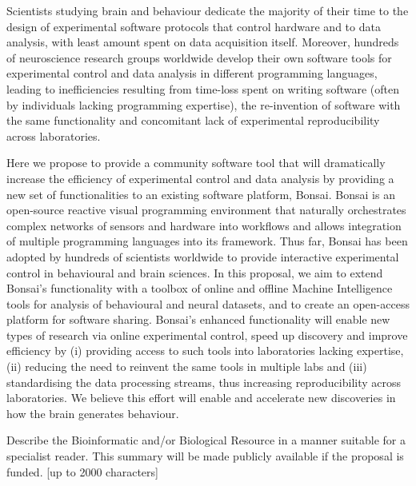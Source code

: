 Scientists studying brain and behaviour dedicate the majority of their time to the design of experimental software protocols that control hardware and to data analysis, with least amount spent on data acquisition itself. Moreover, hundreds of neuroscience research groups worldwide develop their own software tools for experimental control and data analysis in different programming languages, leading to inefficiencies resulting from time-loss spent on writing software (often by individuals lacking programming expertise), the re-invention of software with the same functionality and concomitant lack of experimental reproducibility across laboratories. 

Here we propose to provide a community software tool that will dramatically increase the efficiency of experimental control and data analysis by providing a new set of functionalities to an existing software platform, Bonsai. Bonsai is an open-source reactive visual programming environment that naturally orchestrates complex networks of sensors and hardware into workflows and allows integration of multiple programming languages into its framework. Thus far, Bonsai has been adopted by hundreds of scientists worldwide to provide interactive experimental control in behavioural and brain sciences. In this proposal, we aim to extend Bonsai’s functionality with a toolbox of online and offline Machine Intelligence tools for analysis of behavioural and neural datasets, and to create an open-access platform for software sharing. Bonsai’s enhanced functionality will enable new types of research via online experimental control, speed up discovery and improve efficiency by (i) providing access to such tools into laboratories lacking expertise, (ii) reducing the need to reinvent the same tools in multiple labs and (iii) standardising the data processing streams, thus increasing reproducibility across laboratories. We believe this effort will enable and accelerate new discoveries in how the brain generates behaviour. 



Describe the Bioinformatic and/or Biological Resource in a manner suitable for a specialist reader. This summary will be made publicly available if the proposal is funded. [up to 2000 characters]

